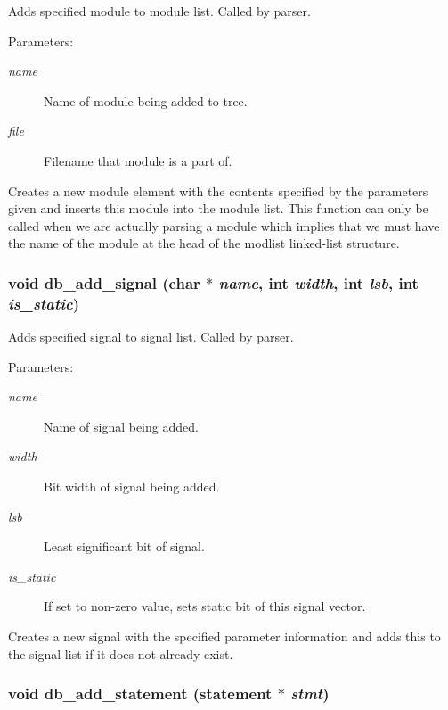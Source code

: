Adds specified module to module list. Called by parser.

\begin{Desc}
\item[Parameters: ]\par
\begin{description}
\item[{\em 
name}]Name of module being added to tree. \item[{\em 
file}]Filename that module is a part of.\end{description}
\end{Desc}
Creates a new module element with the contents specified by the parameters given and inserts this module into the module list. This function can only be called when we are actually parsing a module which implies that we must have the name of the module at the head of the modlist linked-list structure. 
\subsubsection{\setlength{\rightskip}{0pt plus 5cm}void db\_\-add\_\-signal (char $\ast$ {\em name}, int {\em width}, int {\em lsb}, int {\em is\_\-static})}\label{db_8c_a20}


Adds specified signal to signal list. Called by parser.

\begin{Desc}
\item[Parameters: ]\par
\begin{description}
\item[{\em 
name}]Name of signal being added. \item[{\em 
width}]Bit width of signal being added. \item[{\em 
lsb}]Least significant bit of signal. \item[{\em 
is\_\-static}]If set to non-zero value, sets static bit of this signal vector.\end{description}
\end{Desc}
Creates a new signal with the specified parameter information and adds this to the signal list if it does not already exist. 
\subsubsection{\setlength{\rightskip}{0pt plus 5cm}void db\_\-add\_\-statement ({\bf statement} $\ast$ {\em stmt})}\label{db_8c_a25}


